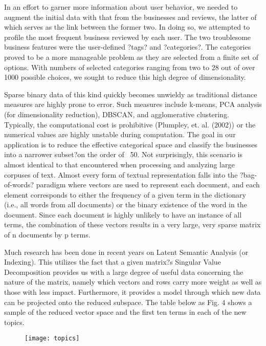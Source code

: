 \quad In an effort to garner more information about user behavior, we needed to augment the initial data with that from the businesses and reviews, the latter of which serves as the link between the former two. In doing so, we attempted to profile the most frequent business reviewed by each user. The two troublesome business features were the user-defined ?tags? and ?categories?. The categories proved to be a more manageable problem as they are selected from a finite set of options. With numbers of selected categories ranging from two to 28 out of over 1000 possible choices, we sought to reduce this high degree of dimensionality.

\quad Sparse binary data of this kind quickly becomes unwieldy as traditional distance measures are highly prone to error. Such measures include k-means, PCA analysis (for dimensionality reduction), DBSCAN, and agglomerative clustering. Typically, the computational cost is prohibitive (Plumpley, et. al. (2002)) or the numerical values are highly unstable during computation. The goal in our application is to reduce the effective categorical space and classify the businesses into a narrower subset?on the order of ~50. Not surprisingly, this scenario is almost identical to that encountered when processing and analyzing large corpuses of text. Almost every form of textual representation falls into the ?bag-of-words? paradigm where vectors are used to represent each document, and each element corresponds to either the frequency of a given term in the dictionary (i.e., all words from all documents) or the binary existence of the word in the document. Since each document is highly unlikely to have an instance of all terms, the combination of these vectors results in a very large, very sparse matrix of n documents by p terms.

\quad Much research has been done in recent years on Latent Semantic Analysis (or Indexing). This utilizes the fact that a given matrix?s Singular Value Decomposition provides us with a large degree of useful data concerning the nature of the matrix, namely which vectors and rows carry more weight as well as those with less impact. Furthermore, it provides a model through which new data can be projected onto the reduced subspace. The table below as Fig. 4 shows a sample of the reduced vector space and the first ten terms in each of the new topics.

\begin{figure}[!h]
\texttt{[image: topics]}
\end{figure}

